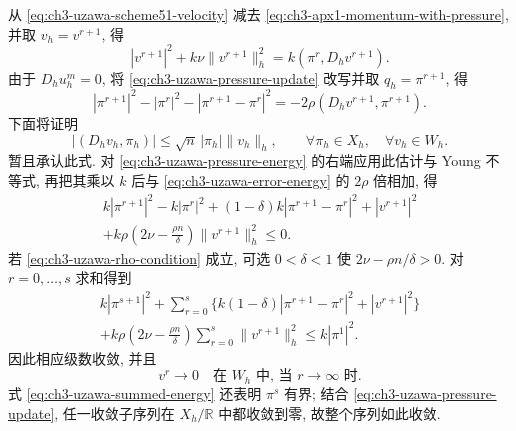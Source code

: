 \begin{Proof}
\hypertarget{chapter-03-page-279}{}
从 \eqref{eq:ch3-uzawa-scheme51-velocity} 减去 \eqref{eq:ch3-apx1-momentum-with-pressure}, 并取 $v_h=v^{r+1}$, 得
\begin{equation}
|v^{r+1}|^2+k\nu\lVert v^{r+1}\rVert_h^2
=k(\pi^r,D_hv^{r+1}).
\label{eq:ch3-uzawa-error-energy}
\end{equation}
由于 $D_hu_h^m=0$, 将 \eqref{eq:ch3-uzawa-pressure-update} 改写并取 $q_h=\pi^{r+1}$, 得
\begin{equation}
|\pi^{r+1}|^2-|\pi^r|^2-|\pi^{r+1}-\pi^r|^2
=-2\rho(D_hv^{r+1},\pi^{r+1}).
\label{eq:ch3-uzawa-pressure-energy}
\end{equation}
下面将证明
\begin{equation}
|(D_hv_h,\pi_h)|\leq\sqrt n\,|\pi_h|\lVert v_h\rVert_h,
\qquad\forall\pi_h\in X_h,\quad\forall v_h\in W_h.
\label{eq:ch3-divergence-pressure-bound}
\end{equation}
暂且承认此式. 对 \eqref{eq:ch3-uzawa-pressure-energy} 的右端应用此估计与 Young 不等式, 再把其乘以 $k$ 后与 \eqref{eq:ch3-uzawa-error-energy} 的 $2\rho$ 倍相加, 得
\begin{equation}
\begin{split}
k|\pi^{r+1}|^2-k|\pi^r|^2+(1-\delta)k|\pi^{r+1}-\pi^r|^2
+|v^{r+1}|^2\\
+k\rho\left(2\nu-\frac{\rho n}{\delta}\right)\lVert v^{r+1}\rVert_h^2\leq0.
\end{split}
\label{eq:ch3-uzawa-monotonicity}
\end{equation}
若 \eqref{eq:ch3-uzawa-rho-condition} 成立, 可选 $0<\delta<1$ 使 $2\nu-\rho n/\delta>0$. 对 $r=0,\ldots,s$ 求和得到
\begin{equation}
\begin{split}
k|\pi^{s+1}|^2+\sum_{r=0}^s\{k(1-\delta)|\pi^{r+1}-\pi^r|^2+|v^{r+1}|^2\}\\
+k\rho\left(2\nu-\frac{\rho n}{\delta}\right)\sum_{r=0}^s\lVert v^{r+1}\rVert_h^2
\leq k|\pi^1|^2.
\end{split}
\label{eq:ch3-uzawa-summed-energy}
\end{equation}
因此相应级数收敛, 并且
\begin{equation}
v^r\to0\quad\text{在 $W_h$ 中, 当 $r\to\infty$ 时}.
\label{eq:ch3-uzawa-velocity-error-limit}
\end{equation}
式 \eqref{eq:ch3-uzawa-summed-energy} 还表明 $\pi^s$ 有界; 结合 \eqref{eq:ch3-uzawa-pressure-update}, 任一收敛子序列在 $X_h/\mathbb R$ 中都收敛到零, 故整个序列如此收敛.
\end{Proof}

